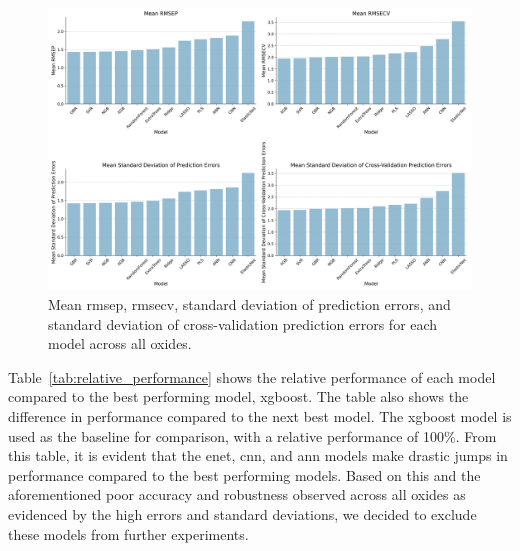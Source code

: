 \begin{figure}[h]
    \centering
    \includegraphics[width=\textwidth]{images/init_results_means.png}
    \caption{Mean \gls{rmsep}, \gls{rmsecv}, standard deviation of prediction errors, and standard deviation of cross-validation prediction errors for each model across all oxides.}
    \label{fig:init_results_rmses}
\end{figure}

Table~\ref{tab:relative_performance} shows the relative performance of each model compared to the best performing model, \gls{xgboost}.
The table also shows the difference in performance compared to the next best model.
The \gls{xgboost} model is used as the baseline for comparison, with a relative performance of 100\%.
From this table, it is evident that the \gls{enet}, \gls{cnn}, and \gls{ann} models make drastic jumps in performance compared to the best performing models.
Based on this and the aforementioned poor accuracy and robustness observed across all oxides as evidenced by the high errors and standard deviations, we decided to exclude these models from further experiments.

